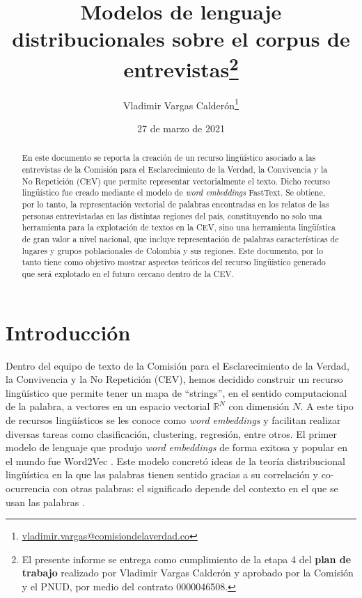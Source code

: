 \documentclass[
  spanish,
]{article}
\title{Modelos de lenguaje distribucionales sobre el corpus de
entrevistas\footnote{El presente informe se entrega como cumplimiento de
  la etapa 4 del \textbf{plan de trabajo} realizado por Vladimir Vargas
  Calderón y aprobado por la Comisión y el PNUD, por medio del contrato
  0000046508.}}
\author{Vladimir Vargas Calderón\footnote{
  \url{vladimir.vargas@comisiondelaverdad.co}}}
\date{27 de marzo de 2021}
\begin{document}
\maketitle
\begin{abstract}
En este documento se reporta la creación de un recurso lingüístico
asociado a las entrevistas de la Comisión para el Esclarecimiento de la
Verdad, la Convivencia y la No Repetición (CEV) que permite representar
vectorialmente el texto. Dicho recurso lingüístico fue creado mediante
el modelo de \emph{word embeddings} FastText. Se obtiene, por lo tanto,
la representación vectorial de palabras encontradas en los relatos de
las personas entrevistadas en las distintas regiones del país,
constituyendo no solo una herramienta para la explotación de textos en
la CEV, sino una herramienta lingüística de gran valor a nivel nacional,
que incluye representación de palabras características de lugares y
grupos poblacionales de Colombia y sus regiones. Este documento, por lo
tanto tiene como objetivo mostrar aspectos teóricos del recurso
lingüistico generado que será explotado en el futuro cercano dentro de
la CEV.
\end{abstract}

\section{Introducción}

Dentro del equipo de texto de la Comisión para el Esclarecimiento de la
Verdad, la Convivencia y la No Repetición (CEV), hemos decidido
construir un recurso lingüístico que permite tener un mapa de
``strings'', en el sentido computacional de la palabra, a vectores en un
espacio vectorial \(\mathbb{R}^N\) con dimensión \(N\). A este tipo de
recursos lingüísticos se les conoce como \emph{word embeddings}
\citep{zamani2016embedding} y facilitan realizar diversas tareas como
clasificación, clustering, regresión, entre otros. El primer modelo de
lenguaje que produjo \emph{word embeddings} de forma exitosa y popular
en el mundo fue Word2Vec
\citep{mikolov2013efficient, mikolov2013distributed, mikolov2013linguistic}.
Este modelo concretó ideas de la teoría distribucional lingüística en la
que las palabras tienen sentido gracias a su correlación y co-ocurrencia
con otras palabras: el significado depende del contexto en el que se
usan las palabras
\citep{harris1954distributional, sahlgren2008distributional}.
\end{document}
